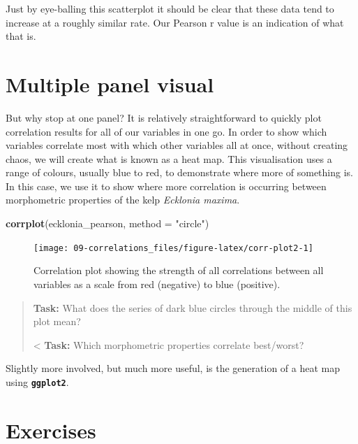\documentclass[english,10pt,a4paper,oneside]{book}
\newenvironment{Shaded}{\begin{snugshade}}{\end{snugshade}}
\newcommand{\DataTypeTok}[1]{\textcolor[rgb]{0.13,0.29,0.53}{#1}}
\newcommand{\KeywordTok}[1]{\textcolor[rgb]{0.13,0.29,0.53}{\textbf{#1}}}
\newcommand{\NormalTok}[1]{#1}
\newcommand{\StringTok}[1]{\textcolor[rgb]{0.31,0.60,0.02}{#1}}
\theoremstyle{definition}
\theoremstyle{definition}
\theoremstyle{definition}
\theoremstyle{remark}
\begin{document}
Just by eye-balling this scatterplot it should be clear that these data
tend to increase at a roughly similar rate. Our Pearson r value is an
indication of what that is.

\hypertarget{multiple-panel-visual}{%
\section{Multiple panel visual}\label{multiple-panel-visual}}

But why stop at one panel? It is relatively straightforward to quickly
plot correlation results for all of our variables in one go. In order to
show which variables correlate most with which other variables all at
once, without creating chaos, we will create what is known as a heat
map. This visualisation uses a range of colours, usually blue to red, to
demonstrate where more of something is. In this case, we use it to show
where more correlation is occurring between morphometric properties of
the kelp \emph{Ecklonia maxima}.

\begin{Shaded}
\begin{Highlighting}[]
\KeywordTok{corrplot}\NormalTok{(ecklonia_pearson, }\DataTypeTok{method =} \StringTok{"circle"}\NormalTok{)}
\end{Highlighting}
\end{Shaded}

\begin{figure}
\texttt{[image: 09-correlations\_files/figure-latex/corr-plot2-1]} \caption{Correlation plot showing the strength of all correlations between all variables as a scale from red (negative) to blue (positive).}\label{fig:corr-plot2}
\end{figure}

\begin{quote}
\textbf{Task:} What does the series of dark blue circles through the
middle of this plot mean?

\textless{} \textbf{Task:} Which morphometric properties correlate
best/worst?
\end{quote}

Slightly more involved, but much more useful, is the generation of a
heat map using \textbf{\texttt{ggplot2}}.

\hypertarget{exercises-5}{%
\section{Exercises}\label{exercises-5}}
\end{document}

